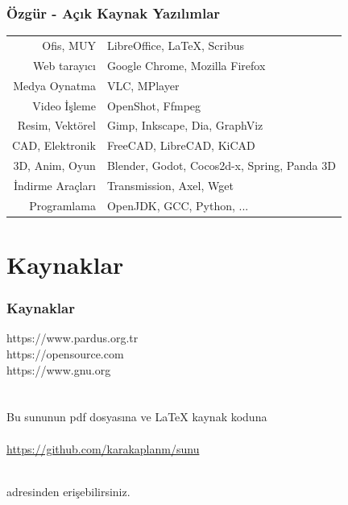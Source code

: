 \documentclass[english,svgnames,notes=hide,12pt]{beamer}
\begin{document}
\begin{frame}
\frametitle{Özgür - Açık Kaynak Yazılımlar}
\begin{tabular}{rl}
Ofis, MUY & LibreOffice,  \LaTeX{}, Scribus\\
Web tarayıcı &Google Chrome, Mozilla Firefox\\
Medya Oynatma &VLC, MPlayer\\
Video İşleme & OpenShot, Ffmpeg \\
Resim, Vektörel& Gimp, Inkscape, Dia, GraphViz\\
CAD, Elektronik  &FreeCAD, LibreCAD, KiCAD\\
	3D, Anim, Oyun & Blender, Godot, Cocos2d-x, Spring, Panda 3D  \\
İndirme Araçları & Transmission, Axel, Wget\\ 
Programlama & OpenJDK, GCC, Python, ...\\ 
\end{tabular}
\end{frame}


\section{Kaynaklar}
\begin{frame}
    \frametitle{Kaynaklar}
https://www.pardus.org.tr\\
https://opensource.com\\
https://www.gnu.org \\
~\\
~\\
	Bu sununun pdf dosyasına ve \LaTeX{} kaynak koduna \\
~\\
\href{https://github.com/karakaplanm/sunu}{https://github.com/karakaplanm/sunu}

~\\
adresinden erişebilirsiniz.

\end{frame}
\end{document}
